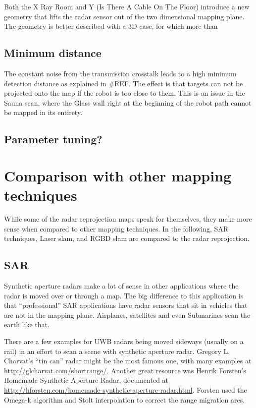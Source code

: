 Both the X Ray Room and Y (Is There A Cable On The Floor) introduce a
new geometry that lifts the radar sensor out of the two dimensional
mapping plane. The geometry is better described with a 3D case, for
which more than

\subsection{Minimum distance}\label{minimum-distance}

The constant noise from the transmission crosstalk leads to a high
minimum detection distance as explained in \#REF. The effect is that
targets can not be projected onto the map if the robot is too close to
them. This is an issue in the Sauna scan, where the Glass wall right at
the beginning of the robot path cannot be mapped in its entirety.

\subsection{Parameter tuning?}\label{parameter-tuning}



\section{Comparison with other mapping
techniques}\label{comparison-with-other-mapping-techniques}

While some of the radar reprojection maps speak for themselves, they
make more sense when compared to other mapping techniques. In the
following, SAR techniques, Laser slam, and RGBD slam are compared to the
radar reprojection.

\subsection{SAR}\label{sar-1}

Synthetic aperture radars make a lot of sense in other applications
where the radar is moved over or through a map. The big difference to
this application is that ``professional'' SAR applications have radar
sensors that sit in vehicles that are not in the mapping plane.
Airplanes, satellites and even Submarines scan the earth like that.

There are a few examples for UWB radars being moved sideways (usually on
a rail) in an effort to scan a scene with synthetic aperture radar.
Gregory L. Charvat's ``tin can'' radar \cite{Charvat2014} might be the
most famous one, with many examples at \url{http://glcharvat.com/shortrange/}.
Another great resource was Henrik Forsten's Homemade Synthetic Aperture
Radar, documented at \url{http://hforsten.com/homemade-synthetic-aperture-radar.html}. Forsten used
the Omega-k algorithm \cite{Tolman2008} and Stolt interpolation \cite{Cumming2004} to correct the range migration arcs.

